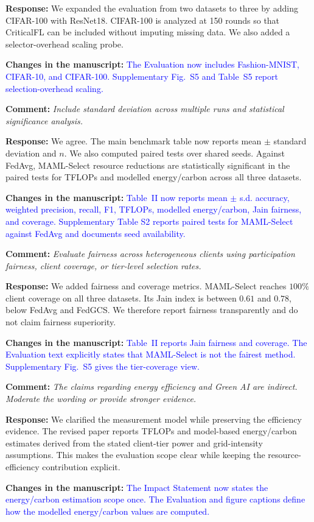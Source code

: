 \documentclass[11pt]{article}
\newcommand{\comment}[1]{\textbf{Comment:} \textit{#1}}
\newcommand{\response}[1]{\textbf{Response:} #1}
\newcommand{\change}[1]{\textbf{Changes in the manuscript:} \textcolor{blue}{#1}}
\begin{document}
\response{We expanded the evaluation from two datasets to three by adding CIFAR-100 with ResNet18. CIFAR-100 is analyzed at 150 rounds so that CriticalFL can be included without imputing missing data. We also added a selector-overhead scaling probe.}

\change{The Evaluation now includes Fashion-MNIST, CIFAR-10, and CIFAR-100. Supplementary Fig.~S5 and Table~S5 report selection-overhead scaling.}

\comment{Include standard deviation across multiple runs and statistical significance analysis.}

\response{We agree. The main benchmark table now reports mean $\pm$ standard deviation and $n$. We also computed paired tests over shared seeds. Against FedAvg, MAML-Select resource reductions are statistically significant in the paired tests for TFLOPs and modelled energy/carbon across all three datasets.}

\change{Table~II now reports mean $\pm$ s.d. accuracy, weighted precision, recall, F1, TFLOPs, modelled energy/carbon, Jain fairness, and coverage. Supplementary Table S2 reports paired tests for MAML-Select against FedAvg and documents seed availability.}

\comment{Evaluate fairness across heterogeneous clients using participation fairness, client coverage, or tier-level selection rates.}

\response{We added fairness and coverage metrics. MAML-Select reaches $100\%$ client coverage on all three datasets. Its Jain index is between $0.61$ and $0.78$, below FedAvg and FedGCS. We therefore report fairness transparently and do not claim fairness superiority.}

\change{Table~II reports Jain fairness and coverage. The Evaluation text explicitly states that MAML-Select is not the fairest method. Supplementary Fig.~S5 gives the tier-coverage view.}

\comment{The claims regarding energy efficiency and Green AI are indirect. Moderate the wording or provide stronger evidence.}

\response{We clarified the measurement model while preserving the efficiency evidence. The revised paper reports TFLOPs and model-based energy/carbon estimates derived from the stated client-tier power and grid-intensity assumptions. This makes the evaluation scope clear while keeping the resource-efficiency contribution explicit.}

\change{The Impact Statement now states the energy/carbon estimation scope once. The Evaluation and figure captions define how the modelled energy/carbon values are computed.}
\end{document}
